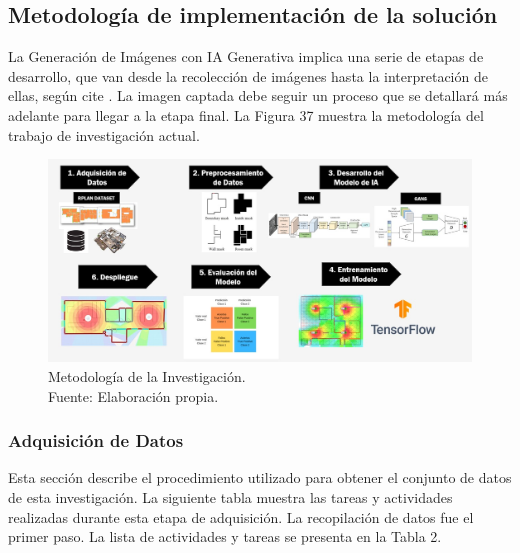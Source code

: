 \subsection{Metodología de implementación de la solución}

La Generación de Imágenes con IA Generativa implica una serie de etapas de desarrollo, que van desde la recolección de imágenes hasta la interpretación de ellas, según cite \cite{tec_kingma2019variat}. La imagen captada debe seguir un proceso que se detallará más adelante para llegar a la etapa final. La Figura 37 muestra la metodología del trabajo de investigación actual. 

\begin{figure}[h]
	\begin{center}
		\includegraphics[width=1.1\textwidth]{3/figures/metodologia.jpg}
		\caption[Metodología de la Investigación]{Metodología de la Investigación.\\
			Fuente: Elaboración propia.}
		\label{3:fig2}
	\end{center}
\end{figure}

\newpage
\subsubsection{Adquisición de Datos}

Esta sección describe el procedimiento utilizado para obtener el conjunto de datos de esta investigación. La siguiente tabla muestra las tareas y actividades realizadas durante esta etapa de adquisición. La recopilación de datos fue el primer paso. La lista de actividades y tareas se presenta en la Tabla 2.

